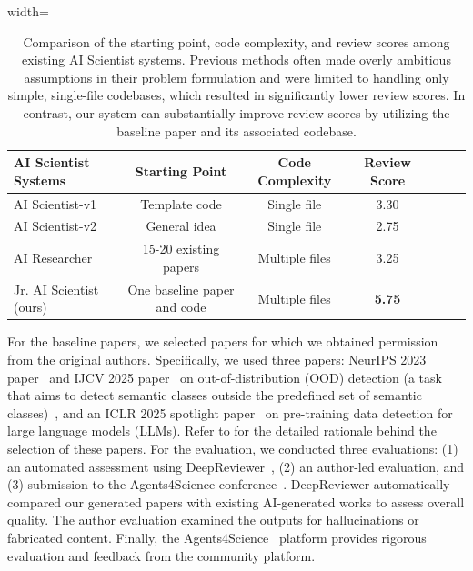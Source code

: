 \begin{table}[t]
\centering
\small
\caption{
Comparison of the starting point, code complexity, and review scores among existing AI Scientist systems.
Previous methods often made overly ambitious assumptions in their problem formulation and were limited to handling only simple, single-file codebases, which resulted in significantly lower review scores.
In contrast, our system can substantially improve review scores by utilizing the baseline paper and its associated codebase.
}
\label{tab:ai_scientist_problem_setting}
\vspace{5pt}
\begin{adjustbox}{width=\textwidth}
\begin{tabular}{lcccccc}
\toprule
\textbf{AI Scientist Systems} & \textbf{Starting Point} & \textbf{Code Complexity} & \textbf{Review Score} \\
\midrule
AI Scientist-v1~\citep{lu2024ai} & Template code  & Single file & 3.30 \\
AI Scientist-v2~\citep{yamada2025ai} & General idea  &  Single file & 2.75 \\
AI Researcher~\citep{tang2025ai} & 15-20 existing papers &  Multiple files  &  3.25 \\
Jr. AI Scientist (ours) & One baseline paper and code  & Multiple files & \textbf{5.75} \\
\bottomrule
\end{tabular}
\end{adjustbox}
\label{table:max_score}
\end{table}

For the baseline papers, we selected papers for which we obtained permission from the original authors. Specifically, we used three papers: NeurIPS 2023 paper~\citep{miyai2023locoop} and IJCV 2025 paper~\citep{miyai2025gl} on out-of-distribution (OOD) detection (a task that aims to detect semantic classes outside the predefined set of semantic classes)~\citep{msp17iclr, yang2024generalized}, and an ICLR 2025 spotlight paper~\citep{zhang2024min} on pre-training data detection for large language models (LLMs). Refer to  for the detailed rationale behind the selection of these papers. 
For the evaluation, we conducted three evaluations: (1) an automated assessment using DeepReviewer~\citep{zhu2025deepreview}, (2) an author-led evaluation, and (3) submission to the Agents4Science conference~\citep{agents4science}.
DeepReviewer automatically compared our generated papers with existing AI-generated works to assess overall quality.
The author evaluation examined the outputs for hallucinations or fabricated content.
Finally, the Agents4Science~\citep{agents4science} platform provides rigorous evaluation and feedback from the community platform.

